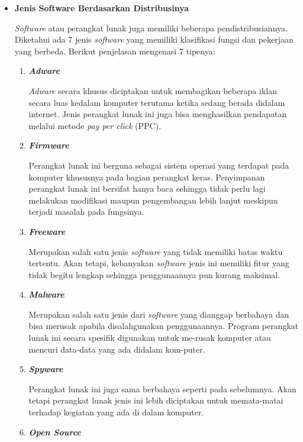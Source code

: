 \documentclass[12pt]{article}
\begin{document}
\begin{itemize}
        \item \textbf{Jenis Software Berdasarkan Distribusinya}
        \par
        \textit{Software} atau perangkat lunak juga memiliki beberapa pendistribusiannya. Diketahui ada 7 jenis \textit{software} yang memiliki klasifikasi fungsi dan pekerjaan yang berbeda.\cite{IDCloudHost}\cite{Gramedia} Berikut penjelasan mengenasi 7 tipenya:
        \begin{enumerate}
            \item \textbf{\textit{Adware}}
            \par
            \textit{Adware} secara khusus diciptakan untuk membagikan beberapa iklan secara luas kedalam komputer terutama ketika sedang berada didalam internet.  Jenis perangkat lunak ini juga bisa menghasilkan pendapatan melalui metode \textit{pay per click} (PPC).\cite{IDCloudHost}
            \item \textbf{\textit{Firmware}}
            \par
            Perangkat lunak ini berguna sebagai sistem operasi yang terdapat pada komputer khususnya pada bagian perangkat keras. Penyimpanan perangkat lunak ini bersifat hanya baca  sehingga tidak perlu lagi melakukan modifikasi maupun pengembangan lebih lanjut meskipun terjadi masalah pada fungsinya.\cite{IDCloudHost}
            \item \textbf{\textit{Freeware}}
            \par
            Merupakan salah satu jenis \textit{software} yang tidak memiliki batas waktu tertentu. Akan tetapi, kebanyakan \textit{software} jenis ini memiliki fitur yang tidak begitu lengkap sehingga penggunaannya pun kurang maksimal.\cite{Gramedia}
            \item \textbf{\textit{Malware}}
            \par
            Merupakan salah satu jenis dari \textit{software} yang dianggap berbahaya dan bisa merusak apabila disalahgunakan penggunaannya. Program perangkat lunak ini secara spesifik digunakan untuk me-rusak komputer atau mencuri data-data yang ada didalam kom-puter.\cite{Gramedia}
            \item \textbf{\textit{Spyware}}
            \par
            Perangkat lunak ini juga sama berbahaya seperti pada sebelumnya. Akan tetapi perangkat lunak jenis ini lebih diciptakan untuk memata-matai terhadap kegiatan yang ada di dalam komputer.\cite{IDCloudHost}
            \item \textbf{\textit{Open Source}}

\end{enumerate}
\end{itemize}
\end{document}
